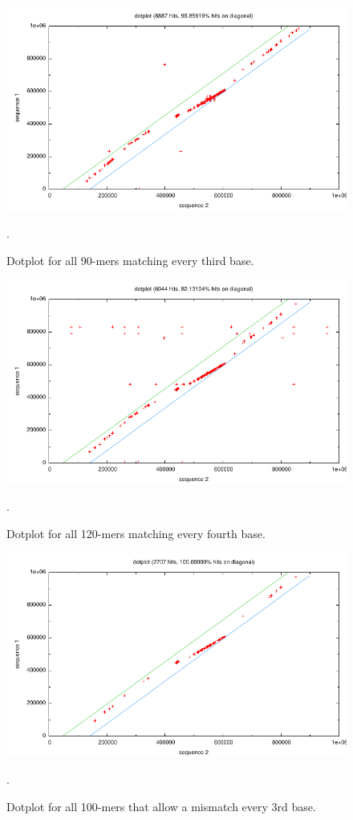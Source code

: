 \begin{figure}[htb]
  \includegraphics[width=6.8in]{6.878/ps1/figs/p3_third90.pdf}
  \caption{Dotplot for all 90-mers matching every third base.}
  \label{problem3:third90}.
\end{figure}

\begin{figure}[htb]
  \includegraphics[width=6.8in]{6.878/ps1/figs/p3_fourth120.pdf}
  \caption{Dotplot for all 120-mers matching every fourth base.}
  \label{problem3:fourth120}.
\end{figure}

\begin{figure}[htb]
  \includegraphics[width=6.8in]{6.878/ps1/figs/p3_nthird100.pdf}
  \caption{Dotplot for all 100-mers that allow a mismatch every 3rd base.}
  \label{problem3:nother100}.
\end{figure}

